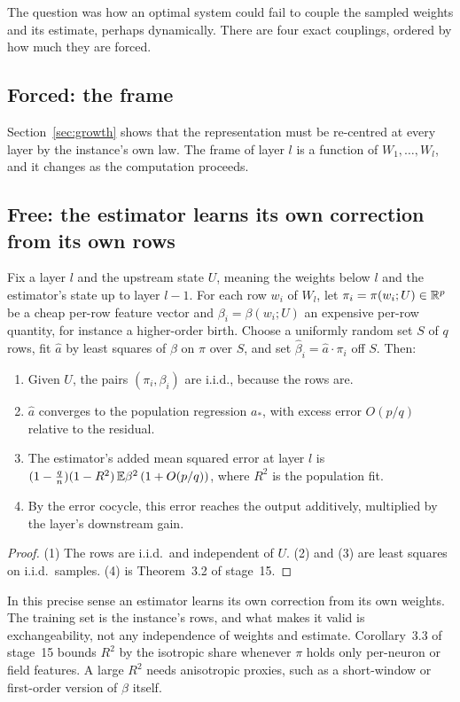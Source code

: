 \label{sec:interdep}
The question was how an optimal system could fail to couple the sampled weights and its estimate, perhaps dynamically. There are four
exact couplings, ordered by how much they are forced.

\subsection{Forced: the frame}
Section~\ref{sec:growth} shows that the representation must be re-centred at every layer by the instance's own law. The frame of layer $l$ is a
function of $W_1,\dots,W_l$, and it changes as the computation proceeds.

\subsection{Free: the estimator learns its own correction from its own rows}
\begin{theorem}\label{thm:selfcal}
Fix a layer $l$ and the upstream state $U$, meaning the weights below $l$ and the estimator's state up to layer $l-1$. For each row $w_i$ of $W_l$,
let $\pi_i=\pi(w_i;U)\in\mathbb R^p$ be a cheap per-row feature vector and $\beta_i=\beta(w_i;U)$ an expensive per-row quantity, for instance a higher-order birth.
Choose a uniformly random set $S$ of $q$ rows, fit $\hat a$ by least squares of $\beta$ on $\pi$ over $S$, and set $\hat\beta_i=\hat a\cdot\pi_i$ off $S$. Then:
\begin{enumerate}[leftmargin=*]
\item Given $U$, the pairs $(\pi_i,\beta_i)$ are i.i.d., because the rows are.
\item $\hat a$ converges to the population regression $a_*$, with excess error $O(p/q)$ relative to the residual.
\item The estimator's added mean squared error at layer $l$ is $(1-\frac qn)(1-R^2)\,\mathbb E\beta^2\,(1+O(p/q))$, where $R^2$ is the population fit.
\item By the error cocycle, this error reaches the output additively, multiplied by the layer's downstream gain.
\end{enumerate}
\end{theorem}
\begin{proof}
(1) The rows are i.i.d.\ and independent of $U$. (2) and (3) are least squares on i.i.d.\ samples. (4) is Theorem~3.2 of stage~15.
\end{proof}
In this precise sense an estimator learns its own correction from its own weights. The training set is the instance's rows, and what makes
it valid is exchangeability, not any independence of weights and estimate. Corollary~3.3 of stage~15 bounds $R^2$ by the isotropic share
whenever $\pi$ holds only per-neuron or field features. A large $R^2$ needs anisotropic proxies, such as a short-window or first-order
version of $\beta$ itself.

